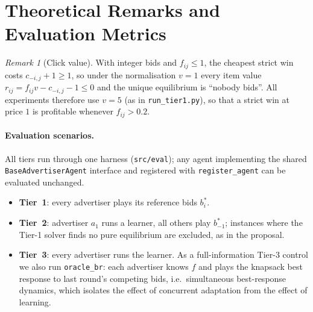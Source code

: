 \documentclass[11pt]{article}
\theoremstyle{remark}
\newtheorem{remark}{Remark}
\begin{document}
\begin{abstract}
This supplementary document provides complete mathematical formulations, theoretical remarks, extended
hypotheses discussions, full per-cell evaluation tables with 95\% Student-$t$ confidence intervals across all
48 parameter configurations $(m,n,\kappa)$ and three round structures (canonical, discounted, cumulative),
along with reproducibility commands for the evaluation harness and live demo.
\end{abstract}

\section{Theoretical Remarks and Evaluation Metrics}\label{sec:supp_model}

\begin{remark}[Click value]\label{rem:v}
With integer bids and $f_{ij}\le 1$, the cheapest strict win costs $c_{-i,j}+1\ge 1$, so under the
normalisation $v=1$ every item value $r_{ij}=f_{ij}v-c_{-i,j}-1\le 0$ and the unique equilibrium is
``nobody bids''. All experiments therefore use $v=5$ (as in \texttt{run\_tier1.py}), so that a strict win at
price $1$ is profitable whenever $f_{ij}>0.2$.
\end{remark}

\paragraph{Evaluation scenarios.} All tiers run through one harness (\texttt{src/eval}); any agent implementing the shared
\texttt{BaseAdvertiserAgent} interface and registered with \texttt{register\_agent} can be evaluated
unchanged.
\begin{itemize}[leftmargin=*]
  \item \textbf{Tier~1}: every advertiser plays its reference bids $b^*_i$.
  \item \textbf{Tier~2}: advertiser $a_1$ runs a learner, all others play $b^*_{-1}$; instances where the Tier-1
        solver finds no pure equilibrium are excluded, as in the proposal.
  \item \textbf{Tier~3}: every advertiser runs the learner. As a full-information Tier-3 control we also run
        \texttt{oracle\_br}: each advertiser knows $f$ and plays the knapsack best response to last round's competing bids,
        i.e.\ simultaneous best-response dynamics, which isolates the effect of concurrent adaptation from the effect of learning.
\end{itemize}
\end{document}
